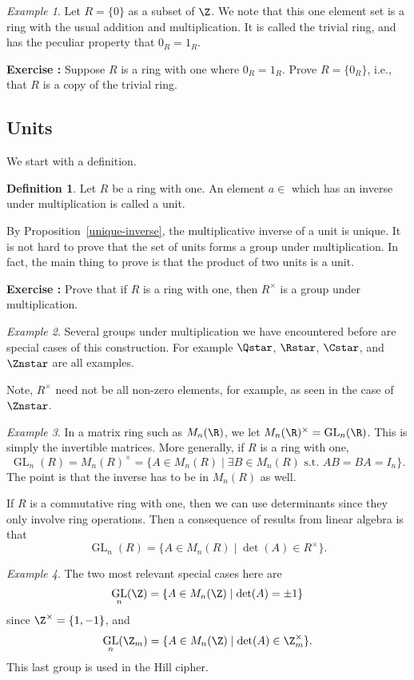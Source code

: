 \documentclass[12pt]{amsart}
\newcommand{\terminology}[1]{\textbf{\textit{#1}}}
\renewcommand{\terminology}[1]{#1}
\newcommand{\term}{\terminology}
\DeclareMathOperator{\GL}{GL}
\newcounter{probs}
\newenvironment{prob}{%
  \refstepcounter{probs}
  \par\medskip\noindent\textbf{Exercise \theprobs:} }{\par\medskip}
\theoremstyle{plain}
\theoremstyle{definition}
\newtheorem{defn}[thm]{Definition}
\theoremstyle{remark}
\newtheorem*{exam}{Example}
\begin{document}
\begin{exam}
  Let $R=\{0\}$ as a subset of $\Z$.  We note that this one element
  set is a ring with the usual addition and multiplication.  It is
  called the \term{trivial ring}, and has the peculiar property that
  $0_R=1_R$.
\end{exam}
\begin{prob} \label{triv-ring-crit}
  Suppose $R$ is a ring with one where $0_R=1_R$.  Prove $R=\{0_R\}$,
  i.e., that $R$ is a copy of the trivial ring.
\end{prob}

\subsection{Units}
We start with a definition.
\begin{defn}
Let $R$ be a ring with one.  An element $a\in $ which has an inverse under
multiplication is called a \term{unit}.  
\end{defn}
By Proposition~\ref{unique-inverse}, the multiplicative inverse of a unit
is unique.  It is not hard to prove that the set of units forms a
group under multiplication.  In fact, the main thing to prove is that
the product of two units is a unit.
\begin{prob}
  Prove that if $R$ is a ring with one, then $R^\times$ is a group
  under multiplication.
\end{prob}
\begin{exam}
  Several groups under multiplication we have encountered before are
  special cases of this construction.  For example $\Qstar$, $\Rstar$,
  $\Cstar$, and $\Znstar$ are all examples.  
\end{exam}
Note, $R^\times$ need not be all non-zero elements, for example, as
seen in the case of $\Znstar$.
\begin{exam}
  In a matrix ring such as $M_n(\R)$, we let $M_n(\R)^\times =
  \GL_n(\R)$.  This is simply the invertible matrices.  More
  generally, if $R$ is a ring with one,
  \[ \GL_n(R)= M_n(R)^\times = \{A\in M_n(R) \mid \exists B\in M_n(R)
  \text{ s.t. } AB=BA=I_n\}.\]
  The point is that the inverse has to be in $M_n(R)$ as well.
\end{exam}

If $R$ is a commutative ring with one, then we can use determinants
since they only involve ring operations.  Then a consequence of
results from linear algebra is that
\[ \GL_n(R) = \{A\in M_n(R)\mid \det(A)\in R^\times\}.\]
\begin{exam}
  The two most relevant special cases here are
  \[ \GL_n(\Z) = \{A\in M_n(\Z)\mid \det(A)=\pm 1\}\]
  since $\Z^\times = \{1,-1\}$, and
  \[ \GL_n(\Z_m) = \{A\in M_n(\Z)\mid \det(A)\in \Z_m^\times\}.\]
  This last group is used in the Hill cipher.
\end{exam}
\end{document}
